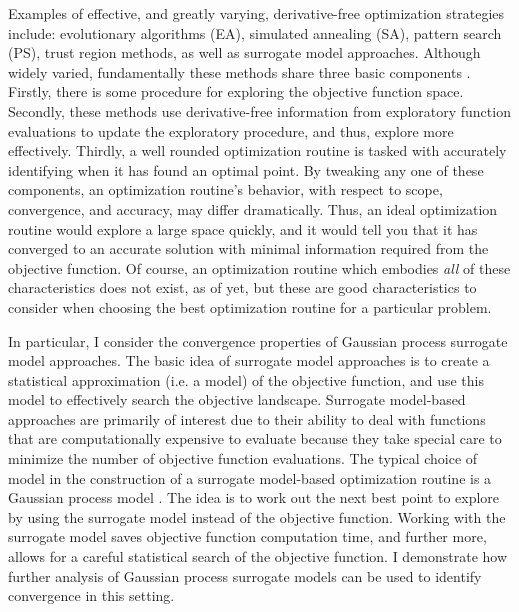 \documentclass[12pt]{article}
\begin{document}
	
	Examples of effective, and greatly varying, derivative-free optimization strategies include: evolutionary algorithms (EA), simulated annealing (SA), pattern search (PS), trust region methods, as well as surrogate model approaches. 
	Although widely varied, fundamentally these methods share three basic components \cite{noGradBook}.
	Firstly, there is some procedure for exploring the objective function space. 
	Secondly, these methods use derivative-free information from exploratory function evaluations to update the exploratory procedure, and thus, explore more effectively.
	Thirdly, a well rounded optimization routine is tasked with accurately identifying when it has found an optimal point.
	By tweaking any one of these components, an optimization routine's behavior, with respect to scope, convergence, and accuracy, may differ dramatically.
	Thus, an ideal optimization routine would explore a large space quickly, and it would tell you that it has converged to an accurate solution with minimal information required from the objective function.
	Of course, an optimization routine which embodies {\it all} of these characteristics does not exist, as of yet, but these are good characteristics to consider when choosing the best optimization routine for a particular problem.


	In particular, I consider the convergence properties of Gaussian process surrogate model approaches.
	The basic idea of surrogate model approaches is to create a statistical approximation (i.e. a model) of the objective function, and use this model to effectively search the objective landscape. 
	Surrogate model-based approaches are primarily of interest due to their ability to deal with functions that are computationally expensive to evaluate because they take special care to minimize the number of objective function evaluations.
	The typical choice of model in the construction of a surrogate model-based optimization routine is a Gaussian process model \cite{gpSurrogate}.
	The idea is to work out the next best point to explore by using the surrogate model instead of the objective function.
	Working with the surrogate model saves objective function computation time, and further more, allows for a careful statistical search of the objective function. 
	I demonstrate how further analysis of Gaussian process surrogate models can be used to identify convergence in this setting.  
\end{document}

